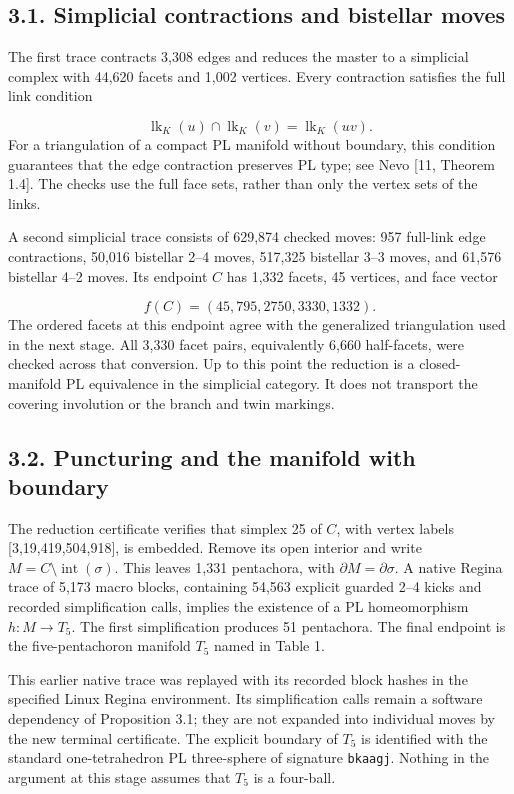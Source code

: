 \documentclass[11pt,letterpaper]{article}
\begin{document}
\subsection*{3.1. Simplicial contractions and bistellar moves}
The first trace contracts 3,308 edges and reduces the master to a simplicial complex with 44,620 facets and 1,002 vertices. Every contraction satisfies the full link condition

\[
\operatorname{lk}_{K}(u)\cap\operatorname{lk}_{K}(v)=\operatorname{lk}_{K}(uv).
\]
For a triangulation of a compact PL manifold without boundary, this condition guarantees that the edge contraction preserves PL type; see Nevo [11, Theorem 1.4]. The checks use the full face sets, rather than only the vertex sets of the links.

A second simplicial trace consists of 629,874 checked moves: 957 full-link edge contractions, 50,016 bistellar 2--4 moves, 517,325 bistellar 3--3 moves, and 61,576 bistellar 4--2 moves. Its endpoint $C$ has 1,332 facets, 45 vertices, and face vector

\[
f(C)=(45,795,2750,3330,1332).
\]
The ordered facets at this endpoint agree with the generalized triangulation used in the next stage. All 3,330 facet pairs, equivalently 6,660 half-facets, were checked across that conversion. Up to this point the reduction is a closed-manifold PL equivalence in the simplicial category. It does not transport the covering involution or the branch and twin markings.

\subsection*{3.2. Puncturing and the manifold with boundary}
The reduction certificate verifies that simplex 25 of $C$, with vertex labels [3,19,419,504,918], is embedded. Remove its open interior and write $M=C\setminus\operatorname{int}(\sigma)$. This leaves 1,331 pentachora, with $\partial M=\partial\sigma$. A native Regina trace of 5,173 macro blocks, containing 54,563 explicit guarded 2--4 kicks and recorded simplification calls, implies the existence of a PL homeomorphism $h:M\longrightarrow T_5$. The first simplification produces 51 pentachora. The final endpoint is the five-pentachoron manifold $T_5$ named in Table 1.

This earlier native trace was replayed with its recorded block hashes in the specified Linux Regina environment. Its simplification calls remain a software dependency of Proposition 3.1; they are not expanded into individual moves by the new terminal certificate. The explicit boundary of $T_5$ is identified with the standard one-tetrahedron PL three-sphere of signature {\small\texttt{bkaagj}}. Nothing in the argument at this stage assumes that $T_5$ is a four-ball.
\end{document}
